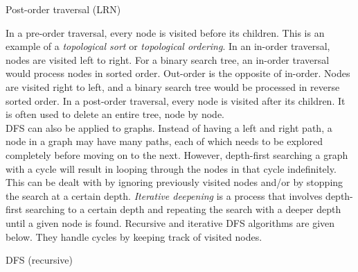 \begin{algorithm}[H]
    \caption{Post-order traversal (LRN)}
\end{algorithm}
\vspace{5mm}

In a pre-order traversal, every node is visited before its children. This is an example of a \textit{topological sort} or \textit{topological ordering}. In an in-order traversal, nodes are visited left to right. For a binary search tree, an in-order traversal would process nodes in sorted order. Out-order is the opposite of in-order. Nodes are visited right to left, and a binary search tree would be processed in reverse sorted order. In a post-order traversal, every node is visited after its children. It is often used to delete an entire tree, node by node. \\

DFS can also be applied to graphs. Instead of having a left and right path, a node in a graph may have many paths, each of which needs to be explored completely before moving on to the next. However, depth-first searching a graph with a cycle will result in looping through the nodes in that cycle indefinitely. This can be dealt with by ignoring previously visited nodes and/or by stopping the search at a certain depth. \textit{Iterative deepening} is a process that involves depth-first searching to a certain depth and repeating the search with a deeper depth until a given node is found. Recursive and iterative DFS algorithms are given below. They handle cycles by keeping track of visited nodes. \\

\begin{algorithm}[H]
    \caption{DFS (recursive)}
\end{algorithm}
\vspace{5mm}

